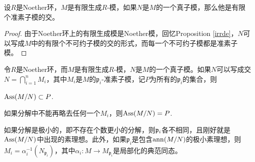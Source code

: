 \begin{pro}\label{pro:5.2.16}
设$R$是Noether环，$M$是有限生成$R$-模，如果$N$是$M$的一个真子模，那么他是有限个准素子模的交。
\end{pro}

\begin{proof}
由于Noether环上的有限生成模是Noether模，回忆Proposition \ref{irrde}，$N$可以写成$M$中的有限个不可约子模的交的形式，而每一个不可约子模都是准素子模。
\end{proof}

\begin{thm}\label{thm:5.2.17}
	令$R$是Noether环，而$M$是有限生成$R$-模，$N$是$M$的一个真子模。如果$N$可以写成交$N=\bigcap_{i=1}^n M_i$，其中$M_i$是$M$的$\mathfrak p_i$-准素子模，记$P$为所有的$\mathfrak p_i$的集合，则
	\begin{compactenum}
		\item $\operatorname{Ass}(M/N)\subset P$.
		\item 如果分解中不能再略去任何一个$M_i$，则$\operatorname{Ass}(M/N) = P$.
		\item 如果分解是极小的，即不存在个数更小的分解，则$\mathfrak{p}_i$各不相同，且刚好就是$\operatorname{Ass}(M/N)$中出现的素理想。此外，如果$\mathfrak p_i$是包含$\operatorname{ann}(M/N)$的极小素理想，则$M_i=\alpha_i^{-1}(N_{\mathfrak p_i})$，其中$\alpha_i:M\to M_{\mathfrak p_i}$是局部化的典范同态。
	\end{compactenum}
\end{thm}

